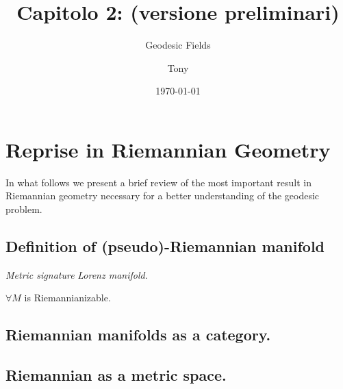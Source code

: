 \documentclass[a4paper,12pt]{scrartcl}    %
\begin{document}
	\title{Capitolo 2: (versione preliminari)}
	\subtitle{Geodesic Fields}
	\author{Tony}
	\date{\today}
\maketitle


\tableofcontents


\newpage

\newpage
\section{Reprise in Riemannian Geometry}
In what follows we present a brief review of the most important result in Riemannian geometry necessary for a better understanding of the geodesic problem.

\subsection{Definition of (pseudo)-Riemannian manifold}
\begin{definition}
\end{definition}

\begin{notationfix}
 \emph{Metric signature} \emph{Lorenz manifold}.
\end{notationfix}

\begin{theorem}
$\forall M$ is Riemannianizable.
\end{theorem}

\subsection{Riemannian manifolds as a category.}
\begin{definition}
\end{definition}

\begin{definition}[Isometry]
\end{definition}

\begin{definition}
\end{definition}

\subsection{Riemannian as a metric space.}
\begin{definition}
\end{definition}
\end{document}
